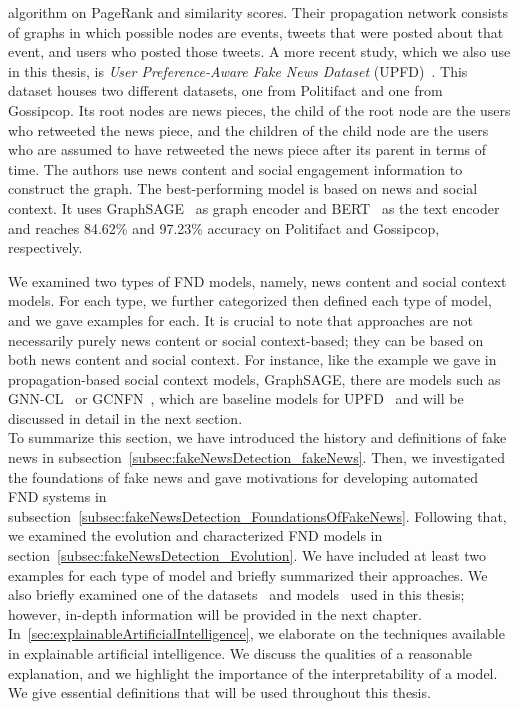 \begin{itemize}
          algorithm on PageRank and similarity scores. Their propagation network consists of graphs in which possible nodes are events, tweets that were posted about that event, and users who posted those tweets. A more recent study, which we also use in this thesis, is \emph{User Preference-Aware Fake News Dataset} (UPFD)~\parencite{UPFD_Dataset_Shu}. This dataset houses two different datasets, one from Politifact and one from Gossipcop. Its root nodes are news pieces, the child of the root node are the users who retweeted the news piece, and the children of the child node are the users who are assumed to have retweeted the news piece after its parent in terms of time. The authors use news content and social engagement information to construct the graph. The best-performing model is based on news and social context. It uses GraphSAGE~\parencite{GraphSAGE_Hamilton} as graph encoder and BERT~\parencite{BERT_Devlin} as the text encoder and reaches 84.62\% and 97.23\% accuracy on Politifact and Gossipcop, respectively.
\end{itemize}
We examined two types of FND models, namely,  news content and social context models. For each type, we further categorized then defined each type of model, and we gave examples for each. It is crucial to note that approaches are not necessarily purely news content or social context-based; they can be based on both news content and social context. For instance, like the example we gave in propagation-based social context models, GraphSAGE, there are models such as GNN-CL~\parencite{GraphNeuralNetworksWithContinualLearningFakeNewsDetection_Han} or
GCNFN~\parencite{FakeNewsDetectionUsingGeometricDeepLearning_Monti}, which are baseline models for UPFD~\parencite{UPFD_Dataset_Shu} and will be discussed in detail in the next section.\\
To summarize this section, we have introduced the history and definitions of fake news in subsection~\ref{subsec:fakeNewsDetection_fakeNews}. Then, we investigated the foundations of fake news and gave motivations for developing automated FND systems in subsection~\ref{subsec:fakeNewsDetection_FoundationsOfFakeNews}. Following that, we examined the evolution and characterized FND models in section~\ref{subsec:fakeNewsDetection_Evolution}. We have included at least two examples for each type of model and briefly summarized their approaches. We also briefly examined one of the datasets~\parencite{UPFD_Dataset_Shu} and models~\parencite{GraphSAGE_Hamilton} used in this thesis; however, in-depth information will be provided in the next chapter.\\
In~\ref{sec:explainableArtificialIntelligence}, we elaborate on the techniques available in explainable artificial intelligence. We discuss the qualities of a reasonable explanation, and we highlight the importance of the interpretability of a model. We give essential definitions that will be used throughout this thesis.

